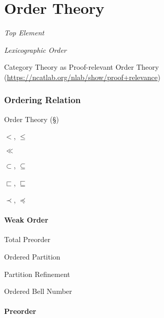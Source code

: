\part{Order Theory}\label{sec:order_theory}


\emph{Top Element}

\emph{Lexicographic Order}

\fist Category Theory as Proof-relevant Order Theory
(\url{https://ncatlab.org/nlab/show/proof+relevance})



\section{Ordering Relation}\label{sec:ordering_relation}

Order Theory (\S\ref{sec:order_theory})

$<$, $\leq$

$\ll$

$\subset$, $\subseteq$

$\sqsubset$, $\sqsubseteq$

$\prec$, $\preceq$



\subsection{Weak Order}\label{sec:weak_order}

Total Preorder

Ordered Partition

Partition Refinement %

Ordered Bell Number



\subsection{Preorder}\label{sec:preorder}

